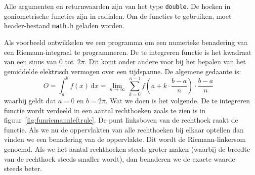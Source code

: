 Alle argumenten en returnwaarden zijn van het type \texttt{double}. De hoeken in goniometrische functies zijn in radialen. Om de functies te gebruiken, moet header-bestand \texttt{math.h} geladen worden.

Als voorbeeld ontwikkelen we een programma om een numerieke benadering van een Riemann-integraal te programmeren. De te integreren functie is het kwadraat van een sinus van 0 tot~$2\pi$. Dit komt onder andere voor bij het bepalen van het gemiddelde elektrisch vermogen over een tijdspanne. De algemene gedaante is:
%
\begin{equation}
O = \int_{a}^{b}f(x)\,\mathrm{d}x = \lim\limits_{n\to\infty}\,\sum_{k=0}^{n-1}f\left(a+k\cdot\frac{b-a}{n}\right)\cdot\frac{b-a}{n}
\end{equation}
%
waarbij geldt dat $a=0$ en $b=2\pi$. Wat we doen is het volgende. De te integreren functie wordt verdeeld in een aantal rechthoeken zoals te zien is in figuur~\ref{fig:funriemannleftrule}. De punt linksboven van de rechthoek raakt de functie. Als we nu de oppervlakten van alle rechthoeken bij elkaar optellen dan vinden we een benadering van de oppervlakte. Dit wordt de Riemann-linkersom genoemd. Als we het aantal rechthoeken steeds groter maken (waarbij de breedte van de rechthoek steeds smaller wordt), dan benaderen we de exacte waarde steeds beter.


